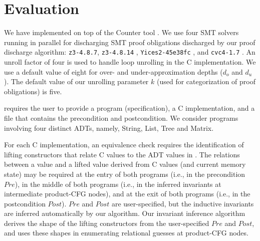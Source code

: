 \section{Evaluation}
\label{sec:syn-eval}

We have implemented \toolName{} on top of the
Counter tool \cite{oopsla20}.
We use four SMT solvers running in parallel for discharging
SMT proof obligations discharged by our proof discharge algorithm:
{\tt z3-4.8.7}, {\tt z3-4.8.14} \cite{z3},
{\tt Yices2-45e38fc} \cite{yices},
and {\tt cvc4-1.7} \cite{cvc4solver}.
An unroll factor of four is used to handle loop unrolling in the C implementation.
We use a default value of eight for
over- and under-approximation depths ($d_o$ and $d_u$).
The default value of
our unrolling parameter $k$ (used for categorization of proof obligations) is five.

\toolName{} requires the user to provide a \SpecL{} program (specification), a C implementation,
and a file that contains the precondition and postcondition.
We consider programs involving four distinct ADTs, namely,
 String,  List,  Tree
and  Matrix.

For each C implementation, an equivalence check requires the identification of
lifting constructors that relate C values to the ADT values in \SpecL{}.
The relations between a \SpecL{} value and a lifted value derived from C values (and current memory state)
may be required at the entry of both programs (i.e., in the precondition $Pre$),
in the middle of both programs (i.e., in the inferred invariants at intermediate product-CFG
nodes), and at the exit of both programs (i.e., in the postcondition $Post$).
$Pre$ and $Post$ are user-specified, but the inductive invariants are inferred
automatically by our algorithm.
Our invariant inference algorithm derives
the shape of the lifting constructors from the user-specified $Pre$ and $Post$,
and uses these shapes in enumerating relational guesses at product-CFG nodes.

